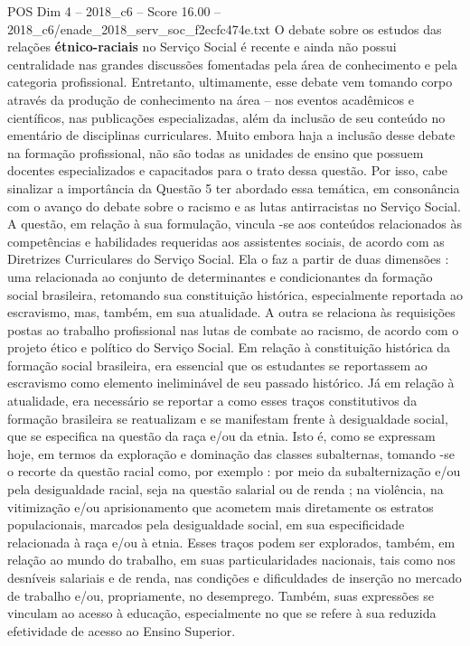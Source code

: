 \begin{textsample}{POS Dim 4 – 2018\_c6 – Score 16.00 – 2018\_c6/enade\_2018\_serv\_soc\_f2ecfc474e.txt}
O debate sobre os estudos das relações \textbf{étnico-raciais} no Serviço Social é recente e ainda não possui centralidade nas grandes discussões fomentadas pela área de conhecimento e pela categoria profissional.
Entretanto, ultimamente, esse debate vem tomando corpo através da produção de conhecimento na área – nos eventos acadêmicos e científicos, nas publicações especializadas, além da inclusão de seu conteúdo no ementário de disciplinas curriculares.
Muito embora haja a inclusão desse debate na formação profissional, não são todas as unidades de ensino que possuem docentes especializados e capacitados para o trato dessa questão.
Por isso, cabe sinalizar a importância da Questão 5 ter abordado essa temática, em consonância com o avanço do debate sobre o racismo e as lutas antirracistas no Serviço Social.
A questão, em relação à sua formulação, vincula -se aos conteúdos relacionados às competências e habilidades requeridas aos assistentes sociais, de acordo com as Diretrizes Curriculares do Serviço Social.
Ela o faz a partir de duas dimensões : uma relacionada ao conjunto de determinantes e condicionantes da formação social brasileira, retomando sua constituição histórica, especialmente reportada ao escravismo, mas, também, em sua atualidade.
A outra se relaciona às requisições postas ao trabalho profissional nas lutas de combate ao racismo, de acordo com o projeto ético e político do Serviço Social.
Em relação à constituição histórica da formação social brasileira, era essencial que os estudantes se reportassem ao escravismo como elemento ineliminável de seu passado histórico.
Já em relação à atualidade, era necessário se reportar a como esses traços constitutivos da formação brasileira se reatualizam e se manifestam frente à desigualdade social, que se especifica na questão da raça e/ou da etnia.
Isto é, como se expressam hoje, em termos da exploração e dominação das classes subalternas, tomando -se o recorte da questão racial como, por exemplo : por meio da subalternização e/ou pela desigualdade racial, seja na questão salarial ou de renda ; na violência, na vitimização e/ou aprisionamento que acometem mais diretamente os estratos populacionais, marcados pela desigualdade social, em sua especificidade relacionada à raça e/ou à etnia.
Esses traços podem ser explorados, também, em relação ao mundo do trabalho, em suas particularidades nacionais, tais como nos desníveis salariais e de renda, nas condições e dificuldades de inserção no mercado de trabalho e/ou, propriamente, no desemprego.
Também, suas expressões se vinculam ao acesso à educação, especialmente no que se refere à sua reduzida efetividade de acesso ao Ensino Superior.

\end{textsample}
